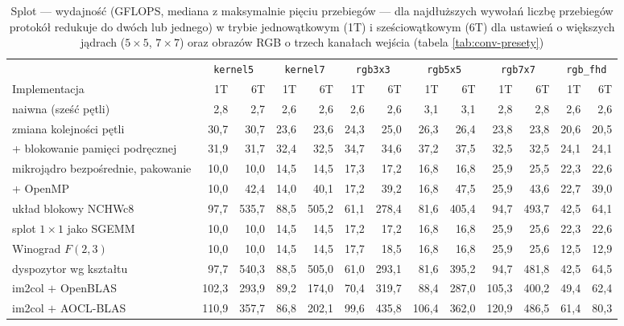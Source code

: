\documentclass[a4paper,12pt]{book} %
\begin{document}
\begin{landscape}
\begin{table}
\centering
\caption{Splot --- wydajność (GFLOPS, mediana z maksymalnie pięciu przebiegów --- dla najdłuższych wywołań liczbę przebiegów protokół redukuje do dwóch lub jednego) w trybie jednowątkowym (1T) i sześciowątkowym (6T) dla ustawień o większych jądrach ($5 \times 5$, $7 \times 7$) oraz obrazów RGB o trzech kanałach wejścia (tabela \ref{tab:conv-presety})}
\label{tab:wyniki-conv-b}
\footnotesize
\setlength{\tabcolsep}{4.5pt}
\begin{tabular}{l rr rr rr rr rr rr}
\hline
 & \multicolumn{2}{c}{\texttt{kernel5}} & \multicolumn{2}{c}{\texttt{kernel7}} & \multicolumn{2}{c}{\texttt{rgb3x3}} & \multicolumn{2}{c}{\texttt{rgb5x5}} & \multicolumn{2}{c}{\texttt{rgb7x7}} & \multicolumn{2}{c}{\texttt{rgb\_fhd}} \\
Implementacja & 1T & 6T & 1T & 6T & 1T & 6T & 1T & 6T & 1T & 6T & 1T & 6T \\
\hline
naiwna (sześć pętli)               &   2,8 &   2,7 &  2,6 &   2,6 &  2,6 &   2,6 &   3,1 &   3,1 &   2,8 &   2,8 &  2,6 &  2,6 \\
zmiana kolejności pętli            &  30,7 &  30,7 & 23,6 &  23,6 & 24,3 &  25,0 &  26,3 &  26,4 &  23,8 &  23,8 & 20,6 & 20,5 \\
{}+ blokowanie pamięci podręcznej  &  31,9 &  31,7 & 32,4 &  32,5 & 34,7 &  34,6 &  37,2 &  37,5 &  32,5 &  32,5 & 24,1 & 24,1 \\
mikrojądro bezpośrednie, pakowanie &  10,0 &  10,0 & 14,5 &  14,5 & 17,3 &  17,2 &  16,8 &  16,8 &  25,9 &  25,5 & 22,3 & 22,6 \\
{}+ OpenMP                         &  10,0 &  42,4 & 14,0 &  40,1 & 17,2 &  39,2 &  16,8 &  47,5 &  25,9 &  43,6 & 22,7 & 39,0 \\
układ blokowy NCHWc8               &  97,7 & 535,7 & 88,5 & 505,2 & 61,1 & 278,4 &  81,6 & 405,4 &  94,7 & 493,7 & 42,5 & 64,1 \\
splot $1 \times 1$ jako SGEMM      &  10,0 &  10,0 & 14,5 &  14,5 & 17,2 &  17,2 &  16,8 &  16,8 &  25,9 &  25,6 & 22,3 & 22,6 \\
Winograd $F(2{,}3)$                &  10,0 &  10,0 & 14,5 &  14,5 & 17,7 &  18,5 &  16,8 &  16,8 &  25,9 &  25,6 & 12,5 & 12,9 \\
dyspozytor wg kształtu             &  97,7 & 540,3 & 88,5 & 505,0 & 61,0 & 293,1 &  81,6 & 395,2 &  94,7 & 481,8 & 42,5 & 64,5 \\
im2col $+$ OpenBLAS                & 102,3 & 293,9 & 89,2 & 174,0 & 70,4 & 319,7 &  88,4 & 287,0 & 105,3 & 400,2 & 49,4 & 62,4 \\
im2col $+$ AOCL-BLAS               & 110,9 & 357,7 & 86,8 & 202,1 & 99,6 & 435,8 & 106,4 & 362,0 & 120,9 & 486,5 & 61,4 & 80,3 \\
\hline
\end{tabular}
\end{table}
\end{landscape}
\end{document}
